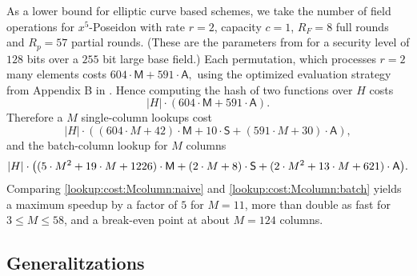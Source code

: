 \documentclass[11pt]{article}
\theoremstyle{definition}
\theoremstyle{definition}
\begin{document}
As a lower bound for elliptic curve based schemes, we take the number of field operations for $x^5$-Poseidon with rate $r=2$, capacity $c=1$, $R_F=8$ full rounds and $R_p=57$ partial rounds. (These are the parameters from \cite{Poseidon} for a security level of $128$ bits over a $255$ bit large base field.) 
Each permutation, which processes $r=2$ many elements costs
$
604\cdot\mathsf M + 591\cdot\mathsf A, 
$ 
using the optimized evaluation strategy from Appendix B in \cite{Poseidon}.
Hence computing the hash of two functions over $H$ costs
\[
|H|\cdot (604\cdot\mathsf M + 591\cdot\mathsf A). 
\]
Therefore a $M$ single-column lookups cost 
\begin{equation}
\label{lookup:cost:Mcolumn:naive}
|H|\cdot ((604\cdot M + 42)\cdot\mathsf M + 10\cdot\mathsf S + (591\cdot M + 30)\cdot\mathsf A),
\end{equation}
and the batch-column lookup for $M$ columns
\begin{equation}
\label{lookup:cost:Mcolumn:batch}
|H| \cdot  \big((5\cdot M^2 + 19 \cdot M + 1226) \cdot\textsf M 
+ (2\cdot M + 8)\cdot\textsf S 
+ (2\cdot M^2 + 13\cdot M + 621) \cdot \textsf A\big).
\end{equation}
Comparing \eqref{lookup:cost:Mcolumn:naive} and \eqref{lookup:cost:Mcolumn:batch} yields  a maximum speedup by a factor of $5$ for $M=11$, more than double as fast for $3\leq M\leq 58$, and a break-even point at about $M=124$ columns.




\subsection{Generalitzations}
\label{s:pa:Generalizations}
\end{document}
